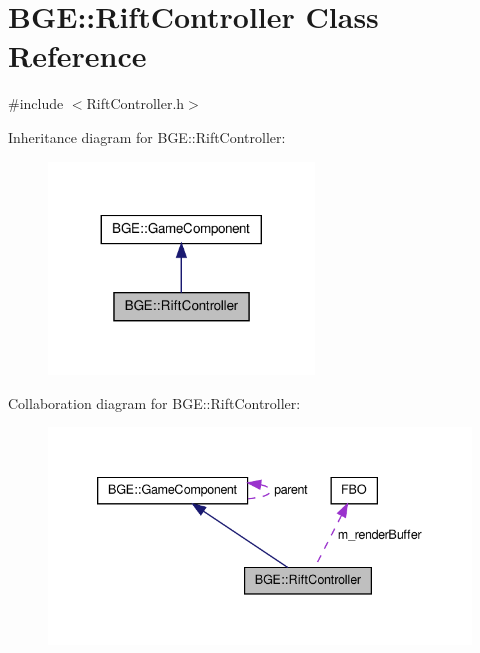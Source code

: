 \hypertarget{class_b_g_e_1_1_rift_controller}{\section{B\-G\-E\-:\-:Rift\-Controller Class Reference}
\label{class_b_g_e_1_1_rift_controller}
}


{\ttfamily \#include $<$Rift\-Controller.\-h$>$}



Inheritance diagram for B\-G\-E\-:\-:Rift\-Controller\-:
\nopagebreak
\begin{figure}[H]
\begin{center}
\leavevmode
\includegraphics[width=200pt]{class_b_g_e_1_1_rift_controller__inherit__graph}
\end{center}
\end{figure}


Collaboration diagram for B\-G\-E\-:\-:Rift\-Controller\-:
\nopagebreak
\begin{figure}[H]
\begin{center}
\leavevmode
\includegraphics[width=339pt]{class_b_g_e_1_1_rift_controller__coll__graph}
\end{center}
\end{figure}
